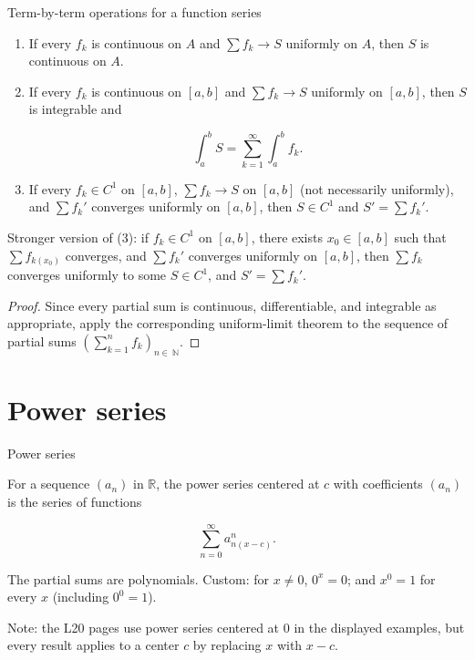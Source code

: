 \begin{theorem}{Term-by-term operations for a function series}

\begin{enumerate}
\item
  If every \(f_{k}\) is continuous on \(A\) and \(\sum f_{k}\rightarrow S\) uniformly on \(A\), then \(S\) is continuous on \(A\).
\item
  If every \(f_{k}\) is continuous on \(\left\lbrack {a,b} \right\rbrack\) and \(\sum f_{k}\rightarrow S\) uniformly on \(\left\lbrack {a,b} \right\rbrack\), then \(S\) is integrable and

  \[\int_{a}^{b}S = \sum\limits_{k = 1}^{\infty}\int_{a}^{b}f_{k}.\]
\item
  If every \(f_{k} \in C^{1}\) on \(\left\lbrack {a,b} \right\rbrack\), \(\sum f_{k}\rightarrow S\) on \(\left\lbrack {a,b} \right\rbrack\) (not necessarily uniformly), and \(\sum f_{k}'\) converges uniformly on \(\left\lbrack {a,b} \right\rbrack\), then \(S \in C^{1}\) and \(S' = \sum f_{k}'\).
\end{enumerate}

Stronger version of (3): if \(f_{k} \in C^{1}\) on \(\left\lbrack {a,b} \right\rbrack\), there exists \(x_{0} \in \left\lbrack {a,b} \right\rbrack\) such that \(\sum f_{k{(x_{0})}}\) converges, and \(\sum f_{k}'\) converges uniformly on \(\left\lbrack {a,b} \right\rbrack\), then \(\sum f_{k}\) converges uniformly to some \(S \in C^{1}\), and \(S' = \sum f_{k}'\).

\end{theorem}

\begin{proof}

Since every partial sum is continuous, differentiable, and integrable as appropriate, apply the corresponding uniform-limit theorem to the sequence of partial sums \(\left( {\sum_{k = 1}^{n}f_{k}} \right)_{n \in \ \mathbb{N}}\).

\end{proof}

\section{Power series}

\begin{definition}{Power series}

For a sequence \(\left( a_{n} \right)\) in \(\mathbb{R}\), the power series centered at \(c\) with coefficients \(\left( a_{n} \right)\) is the series of functions

\[\sum\limits_{n = 0}^{\infty}a_{n{({x - c})}}^{n}.\]

The partial sums are polynomials. Custom: for \(x \neq 0\), \(0^{x} = 0\); and \(x^{0} = 1\) for every \(x\) (including \(0^{0} = 1\)).

Note: the L20 pages use power series centered at \(0\) in the displayed examples, but every result applies to a center \(c\) by replacing \(x\) with \(x - c\).

\end{definition}

